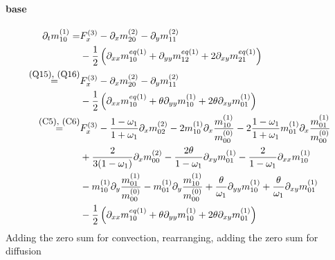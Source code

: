 \documentclass{article}
\begin{document}
  \paragraph{base}
  \begin{equation*}
    \begin{aligned}
    \partial_t m_{10}^{(1)}
      =&
      F_x^{(3)}
      - \partial_x m_{20}^{(2)} - \partial_y m_{11}^{(2)} \\
      &
      - \frac{1}{2} \left(\partial_{xx} m_{10}^{eq(1)} + \partial_{yy} m_{12}^{eq(1)} + 2\partial_{xy} m_{21}^{eq(1)}\right)
     \\ \overset{\text{\small(Q15), (Q16)}}{=} &
     F_x^{(3)}
     - \partial_x m_{20}^{(2)} - \partial_y m_{11}^{(2)} \\
     &
     - \frac{1}{2} \left(\partial_{xx} m_{10}^{eq(1)} + \theta\partial_{yy} m_{10}^{(1)} + 2\theta\partial_{xy} m_{01}^{(1)}\right)
     \\ \overset{\text{\small(C5), (C6)}}{=} &
     F_x^{(3)}
     - \frac{1-\omega_1}{1+\omega_1} \partial_x m_{02}^{(2)}
     - 2 m_{10}^{(1)} \partial_x \frac{ m_{10}^{(1)} }{m_{00}^{(0)}}
     - 2 \frac{1-\omega_1}{1+\omega_1} m_{01}^{(1)}\partial_x\frac{m_{01}^{(1)}}{m_{00}^{(0)}}
     \\&
     + \frac{ 2}{3(1-\omega_1)} \partial_x m_{00}^{(2)}
     - \frac{2\theta}{1-\omega_1}\partial_{xy} m_{01}^{(1)}
     - \frac{2}{1-\omega_1}\partial_{xx} m_{10}^{(1)}
     \\&
     -m_{10}^{(1)}\partial_y \frac{ m_{01}^{(1)}}{m_{00}^{(0)}}
     -m_{01}^{(1)}\partial_y \frac{ m_{10}^{(1)}}{m_{00}^{(0)}}
     + \frac{\theta}{\omega_1}\partial_{yy} m_{10}^{(1)}
     + \frac{\theta}{\omega_1}\partial_{xy} m_{01}^{(1)}
     \\&
     - \frac{1}{2} \left(\partial_{xx} m_{10}^{eq(1)} + \theta\partial_{yy} m_{10}^{(1)} + 2\theta\partial_{xy} m_{01}^{(1)}\right)
    \end{aligned}
  \end{equation*}
Adding the zero sum for convection, rearranging, adding the zero sum for diffusion
\end{document}
